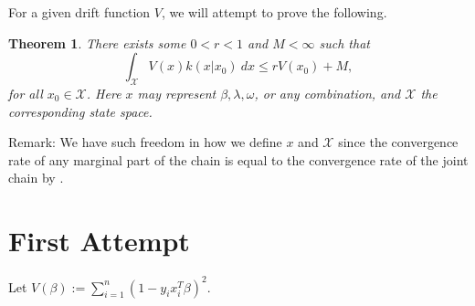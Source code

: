 \documentclass[12pt]{article}
\newtheorem{theorem}{Theorem}
\begin{document}
For a given drift function $V$, we will attempt to prove the following. \\

\begin{theorem}
  There exists some $0 < r < 1$ and $M < \infty$ such that 
  \[
    \int_{\mathcal{X}} V(x)k(x|x_0)\ dx \leq r V(x_0) + M,
  \]
  for all $x_0 \in \mathcal{X}$. Here $x$ may represent $\beta, \lambda, \omega$, or any combination, and $\mathcal{X}$ the corresponding state space.
  \label{thm1}
\end{theorem}

Remark: We have such freedom in how we define $x$ and $\mathcal{X}$ since the convergence rate of any marginal part of the chain is equal to the convergence rate
of the joint chain by \cite{jointvmarg}.

\section{First Attempt}

Let $V(\beta) := \sum_{i=1}^{n}(1 - y_ix_i^T\beta)^2$. \\
\end{document}
